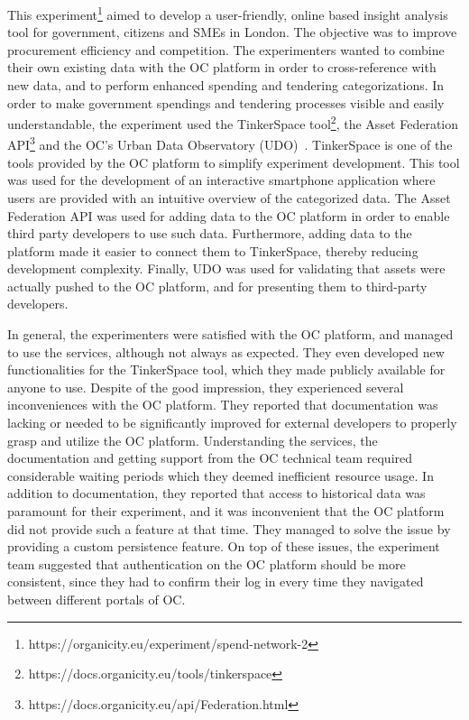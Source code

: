 This experiment\footnote{https://organicity.eu/experiment/spend-network-2} aimed to develop a user-friendly, online based insight analysis tool for government, citizens and SMEs in London. The objective was to improve procurement efficiency and competition. The experimenters wanted to combine their own existing data with the OC platform in order to cross-reference with new data, and to perform enhanced spending and tendering categorizations. In order to make government spendings and tendering processes visible and easily understandable, the experiment used the TinkerSpace tool\footnote{https://docs.organicity.eu/tools/tinkerspace}, the Asset Federation API\footnote{https://docs.organicity.eu/api/Federation.html} and the OC's Urban Data Observatory (UDO)~\cite{gutierrez1}. TinkerSpace is one of the tools provided by the OC platform to simplify experiment development. This tool was used for the development of an interactive smartphone application where users are provided with an intuitive overview of the categorized data. The Asset Federation API was used for adding data to the OC platform in order to enable third party developers to use such data. Furthermore, adding data to the platform made it easier to connect them to TinkerSpace, thereby reducing development complexity. Finally, UDO was used for validating that assets were actually pushed to the OC platform, and for presenting them to third-party developers.

In general, the experimenters were satisfied with the OC platform, and managed to use the services, although not always as expected. They even developed new functionalities for the TinkerSpace tool, which they made publicly available for anyone to use. Despite of the good impression, they experienced several inconveniences with the OC platform. They reported that documentation was lacking or needed to be significantly improved for external developers to properly grasp and utilize the OC platform. Understanding the services, the documentation and getting support from the OC technical team required considerable waiting periods which they deemed inefficient resource usage. In addition to documentation, they reported that access to historical data was paramount for their experiment, and it was inconvenient that the OC platform did not provide such a feature at that time. They managed to solve the issue by providing a custom persistence feature. On top of these issues, the experiment team suggested that authentication on the OC platform should be more consistent, since they had to confirm their log in every time they navigated between different portals of OC.

